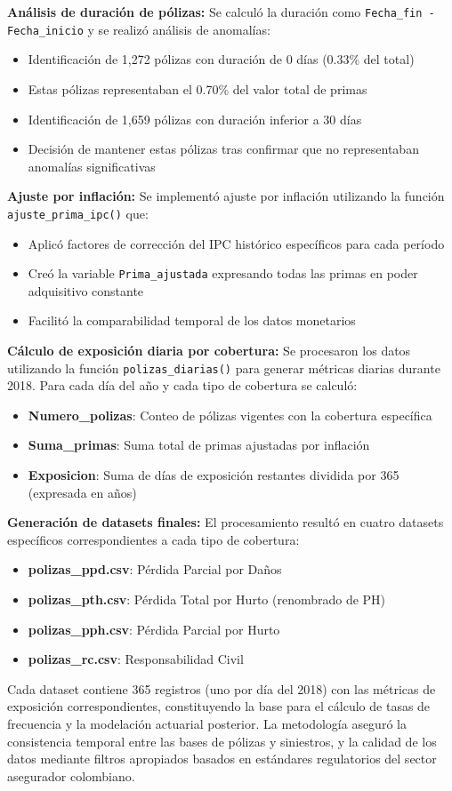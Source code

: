\textbf{Análisis de duración de pólizas:} Se calculó la duración como \texttt{Fecha\_fin - Fecha\_inicio} y se realizó análisis de anomalías:
\begin{itemize}
    \item Identificación de 1,272 pólizas con duración de 0 días (0.33\% del total)
    \item Estas pólizas representaban el 0.70\% del valor total de primas
    \item Identificación de 1,659 pólizas con duración inferior a 30 días
    \item Decisión de mantener estas pólizas tras confirmar que no representaban anomalías significativas
\end{itemize}

\textbf{Ajuste por inflación:} Se implementó ajuste por inflación utilizando la función \texttt{ajuste\_prima\_ipc()} que:
\begin{itemize}
    \item Aplicó factores de corrección del IPC histórico específicos para cada período
    \item Creó la variable \texttt{Prima\_ajustada} expresando todas las primas en poder adquisitivo constante
    \item Facilitó la comparabilidad temporal de los datos monetarios
\end{itemize}

\textbf{Cálculo de exposición diaria por cobertura:} Se procesaron los datos utilizando la función \texttt{polizas\_diarias()} para generar métricas diarias durante 2018. Para cada día del año y cada tipo de cobertura se calculó:
\begin{itemize}
    \item \textbf{Numero\_polizas}: Conteo de pólizas vigentes con la cobertura específica
    \item \textbf{Suma\_primas}: Suma total de primas ajustadas por inflación
    \item \textbf{Exposicion}: Suma de días de exposición restantes dividida por 365 (expresada en años)
\end{itemize}

\textbf{Generación de datasets finales:} El procesamiento resultó en cuatro datasets específicos correspondientes a cada tipo de cobertura:
\begin{itemize}
    \item \textbf{polizas\_ppd.csv}: Pérdida Parcial por Daños
    \item \textbf{polizas\_pth.csv}: Pérdida Total por Hurto (renombrado de PH)
    \item \textbf{polizas\_pph.csv}: Pérdida Parcial por Hurto
    \item \textbf{polizas\_rc.csv}: Responsabilidad Civil
\end{itemize}

Cada dataset contiene 365 registros (uno por día del 2018) con las métricas de exposición correspondientes, constituyendo la base para el cálculo de tasas de frecuencia y la modelación actuarial posterior. La metodología aseguró la consistencia temporal entre las bases de pólizas y siniestros, y la calidad de los datos mediante filtros apropiados basados en estándares regulatorios del sector asegurador colombiano.